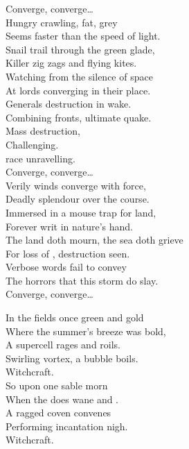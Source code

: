 Converge, converge… \\

Hungry crawling, fat, grey   \\
Seems faster than the speed of light. \\
Snail trail through the green glade, \\
Killer zig zags and flying kites. \\
Watching from the silence of space \\
At lords converging in their place. \\
Generals destruction in wake. \\
Combining fronts, ultimate quake. \\

Mass destruction, \\
Challenging. \\
 race unravelling. \\

Converge, converge… \\

Verily winds converge with force, \\
Deadly splendour over the course. \\
Immersed in a mouse trap for land, \\
Forever writ in nature's hand. \\
The land doth mourn, the sea doth grieve \\
For loss of , destruction seen. \\
Verbose words fail to convey \\
The horrors that this storm do slay. \\

Converge, converge… \\




In the fields once green and gold \\
Where the summer's breeze was bold, \\
A supercell rages and roils. \\
Swirling vortex, a bubble boils. \\
Witchcraft. \\

So upon one sable morn \\
When the  does wane and . \\
A ragged coven convenes \\
Performing incantation nigh. \\
Witchcraft. \\

